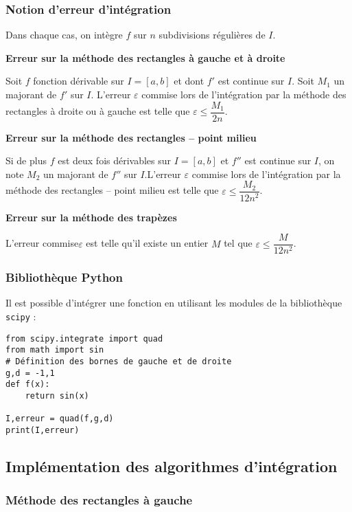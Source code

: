 \subsubsection{Notion d'erreur d'intégration}
\begin{resultat}
Dans chaque cas,  on intègre $f$ sur $n$ subdivisions régulières de $I$. 

\textbf{Erreur sur la méthode des rectangles à gauche et à droite}

Soit $f$ fonction dérivable sur $I=[a,b]$ et dont $f'$ est continue sur $I$. Soit $M_1$ un majorant de $f'$ sur $I$. L'erreur $\varepsilon$ commise lors de l'intégration par la méthode des rectangles à droite ou à gauche
 est telle que $ \varepsilon \leq \dfrac{M_1}{2n}$.

\textbf{Erreur sur la méthode des rectangles -- point milieu}

Si de plus $f$ est deux fois dérivables sur $I=[a,b]$ et $f''$ est continue sur $I$, on note $M_2$ un majorant de $f''$ sur $I$.L'erreur $\varepsilon$ commise lors de l'intégration par la méthode des rectangles -- point milieu est telle que $ \varepsilon \leq \dfrac{M_2}{12n^2}$.

\textbf{Erreur sur la méthode des trapèzes}

L'erreur commise$\varepsilon$ est telle qu'il existe un entier $M$ tel que $ \varepsilon \leq \dfrac{M}{12n^2}$.

\end{resultat}


\subsubsection{Bibliothèque Python}
Il est possible d'intégrer une fonction en utilisant les modules de la bibliothèque \texttt{scipy} :
\begin{lstlisting}
from scipy.integrate import quad
from math import sin
# Définition des bornes de gauche et de droite
g,d = -1,1 
def f(x):
    return sin(x)
   
I,erreur = quad(f,g,d)
print(I,erreur)
\end{lstlisting}

\subsection{Implémentation des algorithmes d'intégration}
\subsubsection{Méthode des rectangles à gauche}

